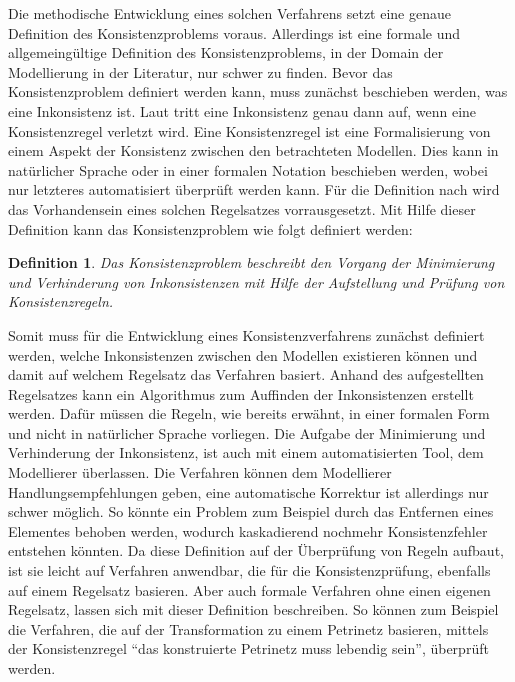Die methodische Entwicklung eines solchen Verfahrens setzt eine genaue Definition des Konsistenzproblems voraus.
Allerdings ist eine formale und allgemeingültige Definition des Konsistenzproblems, in der Domain der Modellierung in der Literatur, nur schwer zu finden.
Bevor das Konsistenzproblem definiert werden kann, muss zunächst beschieben werden, was eine Inkonsistenz ist.
Laut \cite{Nuseibeh1996} tritt eine Inkonsistenz genau dann auf, wenn eine Konsistenzregel verletzt wird.
Eine Konsistenzregel ist eine Formalisierung von einem Aspekt der Konsistenz zwischen den betrachteten Modellen.
Dies kann in natürlicher Sprache oder in einer formalen Notation beschieben werden, wobei nur letzteres automatisiert überprüft werden kann.
Für die Definition nach \cite{Nuseibeh1996} wird das Vorhandensein eines solchen Regelsatzes vorrausgesetzt.
Mit Hilfe dieser Definition kann das Konsistenzproblem wie folgt definiert werden:

\newtheorem*{konsistenzproblem}{Definition}

\begin{konsistenzproblem}
    Das Konsistenzproblem beschreibt den Vorgang der Minimierung und Verhinderung von Inkonsistenzen mit Hilfe der Aufstellung und Prüfung von Konsistenzregeln.
\end{konsistenzproblem}

Somit muss für die Entwicklung eines Konsistenzverfahrens zunächst definiert werden, welche Inkonsistenzen zwischen den Modellen existieren können und damit auf welchem Regelsatz das Verfahren basiert.
Anhand des aufgestellten Regelsatzes kann ein Algorithmus zum Auffinden der Inkonsistenzen erstellt werden.
Dafür müssen die Regeln, wie bereits erwähnt, in einer formalen Form und nicht in natürlicher Sprache vorliegen.
Die Aufgabe der Minimierung und Verhinderung der Inkonsistenz, ist auch mit einem automatisierten Tool, dem Modellierer überlassen.
Die Verfahren können dem Modellierer Handlungsempfehlungen geben, eine automatische Korrektur ist allerdings nur schwer möglich.
So könnte ein Problem zum Beispiel durch das Entfernen eines Elementes behoben werden, wodurch kaskadierend nochmehr Konsistenzfehler entstehen könnten.
Da diese Definition auf der Überprüfung von Regeln aufbaut, ist sie leicht auf Verfahren anwendbar, die für die Konsistenzprüfung, ebenfalls auf einem Regelsatz basieren.
Aber auch formale Verfahren ohne einen eigenen Regelsatz, lassen sich mit dieser Definition beschreiben.
So können zum Beispiel die Verfahren, die auf der Transformation zu einem Petrinetz basieren, mittels der Konsistenzregel ``das konstruierte Petrinetz muss lebendig sein'', überprüft werden.

